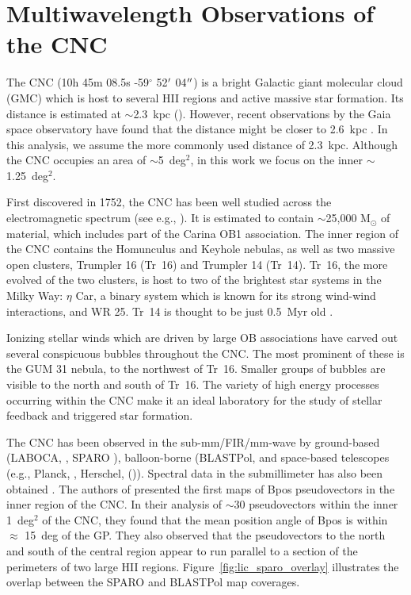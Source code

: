 \section{Multiwavelength Observations of the CNC}\label{multiband comp}

The CNC (10h 45m 08.5s -59$^{\circ}$ 52$\operatorname{^{\prime}}$ 04$\operatorname{^{\prime\prime}}$) is a bright Galactic giant molecular cloud (GMC) which is host to several HII regions and active massive star formation. Its distance is estimated at $\sim$2.3~kpc (\citet{allen1993shape,smith2006structure}). However, recent observations by the Gaia space observatory have found that the distance might be closer to 2.6~kpc \citep{davidson2018gaia}. In this analysis, we assume the more commonly used distance of 2.3~kpc. Although the CNC occupies an area of $\sim$5~deg$^{2}$, in this work we focus on the inner $\sim$1.25~deg$^{2}$.

First discovered in 1752, the CNC has been well studied across the electromagnetic spectrum (see e.g., \citet{smith2008carina}). It is estimated to contain $\sim$25,000 M$_{\odot}$ of material, which includes part of the Carina OB1 association. The inner region of the CNC contains the Homunculus and Keyhole nebulas, as well as two massive open clusters, Trumpler 16 (Tr~16) and Trumpler 14 (Tr~14). Tr~16, the more evolved of the two clusters, is host to two of the brightest star systems in the Milky Way: $\eta$ Car, a binary system which is known for its strong wind-wind interactions, and WR 25. Tr~14 is thought to be just 0.5~Myr old \citep{preibisch2011hawk}.

Ionizing stellar winds which are driven by large OB associations have carved out several conspicuous bubbles throughout the CNC\@. The most prominent of these is the GUM 31 nebula, to the northwest of Tr~16. Smaller groups of bubbles are visible to the north and south of Tr~16. The variety of high energy processes occurring within the CNC make it an ideal laboratory for the study of stellar feedback and triggered star formation.

The CNC has been observed in the sub-mm/FIR/mm-wave by ground-based (LABOCA, \citep{preibisch2011laboca}, SPARO \citep{li2006results}), balloon-borne (BLASTPol, \citep{shariff2019submillimeter} and space-based telescopes (e.g., Planck, \citep{abergel2014planck}, Herschel, (\citet{preibisch2012herschel,gaczkowski2013herschel,roccatagliata2013herschel})). Spectral data in the submillimeter has also been obtained \citep{oberst2006detection}. The authors of \citet{li2006results} presented the first maps of \gls{Bpos} pseudovectors in the inner region of the CNC\@. In their analysis of $\sim$30 pseudovectors within the inner 1~deg$^{2}$ of the CNC, they found that the mean position angle of \gls{Bpos} is within $\approx$ 15~deg of the GP\@. They also observed that the pseudovectors to the north and south of the central region appear to run parallel to a section of the perimeters of two large HII regions. Figure~\ref{fig:lic_sparo_overlay} illustrates the overlap between the SPARO and BLASTPol map coverages.

